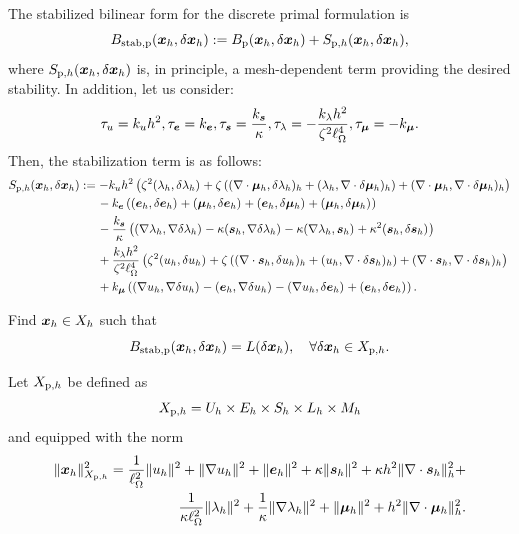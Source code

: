 The stabilized bilinear form for the discrete primal formulation is
$$
\Bsp(\xFh,\delta\xFh) := 
\Bp(\xFh, \delta\xFh)+\Sph(\xFh, \delta\xFh), 
$$
where $\Sph(\xFh, \delta\xFh)$ is, in principle, a mesh-dependent term providing the desired stability. In addition, let us consider:
$$
    \tu = \ku h^2,
    \te = \ke,
    \ts = \frac{\ks}{\kappa},
    \tl = -\frac{\kl h^2}{\zeta^2\length^4},
    \tm = -\km.
$$
Then, the stabilization term is as follows:
\begin{align*}
\Sph(\xFh,\delta\xFh)
&:=-\ku h^2\left(\zeta^2\iprod[]{\lFh}{\delta\lFh}+\zeta\left(\iprod[h]{\nabla\cdot\mFh}{\delta\lFh}+\iprod[h]{\lFh}{\nabla\cdot\delta\mFh}\right)+\iprod[h]{\nabla\cdot\mFh}{\nabla\cdot\delta \mFh}\right)\\
&\quad\:\:-\ke\left(\iprod[]{\eFh}{\delta\eFh}+\iprod[]{\mFh}{\delta\eFh}+\iprod[]{\eFh}{\delta \mFh}+\iprod[]{\mFh}{\delta\mFh}\right)\\
&\quad\:\:-\frac{\ks}{\kappa}\left(\iprod[]{\nabla\lFh}{\nabla\delta\lFh}-\kappa\iprod[]{\sFh}{\nabla\delta\lFh}-\kappa\iprod[]{\nabla\lFh}{\sFh}+\kappa^2\iprod[]{\sFh}{\delta\sFh}\right)\\
&\quad\:\:+\frac{\kl h^2}{\zeta^2\length^4}\left(\zeta^2\iprod[]{\uFh}{\delta\uFh}+\zeta\left(\iprod[h]{\nabla\cdot\sFh}{\delta\uFh}+\iprod[h]{\uFh}{\nabla\cdot\delta\sFh}\right)+\iprod[h]{\nabla\cdot\sFh}{\nabla\cdot\delta \sFh}\right)\\
&\quad\:\:+\km\left(\iprod[]{\nabla\uFh}{\nabla\delta\uFh}-
\iprod[]{\eFh}{\nabla\delta\uFh}-\iprod[]{\nabla\uFh}{\delta\eFh}+\iprod[]{\eFh}{\delta\eFh}\right). 
\end{align*}

\begin{problem}[$P_{\mathrm{p},h}$] Find $\xFh \in X_h$ such that
\begin{equation}
\Bsp(\xFh,\delta \xFh) = L(\delta\xFh),\quad\forall\delta\xFh\in\XSph. 
\end{equation} 
\end{problem}

\begin{definition} Let $\XSph$ be defined as
$$\XSph =  U_h\times E_h\times S_h\times L_h\times M_h$$
and equipped with the norm
\begin{align*}
\norm[\XSph]{\xFh}^2 =
\frac{1}{\length^2}\norm[]{\uFh}^2+
\norm[]{\nabla\uFh}^2+
\norm[]{\eFh}^2+
\kappa\norm[]{\sFh}^2+
\kappa h^2\norm[h]{\nabla\cdot\sFh}^2+\\
\frac{1}{\kappa\length^2}\norm[]{\lFh}^2+
\frac{1}{\kappa}\norm[]{\nabla\lFh}^2+
\norm[]{\mFh}^2+
h^2\norm[h]{\nabla\cdot\mFh}^2.
\end{align*}
\end{definition}

